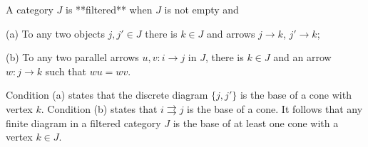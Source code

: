 A category $J$ is **filtered** when $J$ is not empty and

(a) To any two objects $j, j' \in J$ there is $k \in J$ and arrows $j \rightarrow k$, $j' \rightarrow k$;

(b) To any two parallel arrows $u, v : i \rightarrow j$ in $J$, there is $k \in J$ and an arrow $w : j \rightarrow k$ such that $wu = wv$.

Condition (a) states that the discrete diagram $\{j, j'\}$ is the base of a cone with vertex $k$. Condition (b) states that $i \rightrightarrows j$ is the base of a cone. It follows that any finite diagram in a filtered category $J$ is the base of at least one cone with a vertex $k \in J$.
